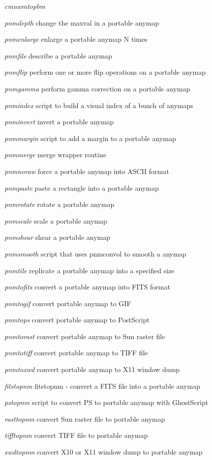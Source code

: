 \begin{TPlist}{{\it cmuwmtopbm}}
\item[{{\it pnmdepth}}]
change the maxval in a portable anymap
\item[{{\it pnmenlarge}}]
enlarge a portable anymap N times
\item[{{\it pnmfile}}]
describe a portable anymap
\item[{{\it pnmflip}}]
perform one or more flip operations on a portable anymap
\item[{{\it pnmgamma}}]
perform gamma correction on a portable anymap
\item[{{\it pnmindex}}]
script to build a visual index of a bunch of anymaps
\item[{{\it pnminvert}}]
invert a portable anymap
\item[{{\it pnmmargin}}]
script to add a margin to a portable anymap
\item[{{\it pnmmerge}}]
merge wrapper routine
\item[{{\it pnmnoraw}}]
force a portable anymap into ASCII format
\item[{{\it pnmpaste}}]
paste a rectangle into a portable anymap
\item[{{\it pnmrotate}}]
rotate a portable anymap
\item[{{\it pnmscale}}]
scale a portable anymap
\item[{{\it pnmshear}}]
shear a portable anymap
\item[{{\it pnmsmooth}}]
script that uses pnmconvol to smooth a anymap
\item[{{\it pnmtile}}]
replicate a portable anymap into a specified size
\item[{{\it pnmtofits}}]
convert a portable anymap into FITS format
\item[{{\it pnmtogif}}]
convert portable anymap to GIF
\item[{{\it pnmtops}}]
convert portable anymap to PostScript
\item[{{\it pnmtorast}}]
convert portable anymap to Sun raster file
\item[{{\it pnmtotiff}}]
convert portable anymap to TIFF file
\item[{{\it pnmtoxwd}}]
convert portable anymap to X11 window dump
\item[{{\it fitstopnm}}]
fitstopnm - convert a FITS file into a portable anymap
\item[{{\it pstopnm}}]
script to convert PS to portable anymap with GhostScript
\item[{{\it rasttopnm}}]
convert Sun raster file to portable anymap
\item[{{\it tifftopnm}}]
convert TIFF file to portable anymap
\item[{{\it xwdtopnm}}]
convert X10 or X11 window dump to portable anymap
\end{TPlist}

